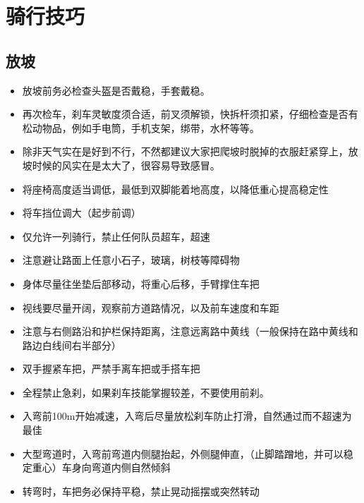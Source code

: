 \documentclass{ctexbook}
\begin{document}
\chapter{骑行技巧}
\section{放坡}
\begin{itemize}
    \item 放坡前务必检查头盔是否戴稳，手套戴稳。

    \item 再次检车，刹车灵敏度须合适，前叉须解锁，快拆杆须扣紧，仔细检查是否有松动物品，例如手电筒，手机支架，绑带，水杯等等。

    \item 除非天气实在是好到不行，不然都建议大家把爬坡时脱掉的衣服赶紧穿上，放坡时候的风实在是太大了，很容易导致感冒。
    
    \item 将座椅高度适当调低，最低到双脚能着地高度，以降低重心提高稳定性

    \item 将车挡位调大（起步前调）
    
    \item 仅允许一列骑行，禁止任何队员超车，超速

    \item 注意避让路面上任意小石子，玻璃，树枝等障碍物

    \item 身体尽量往坐垫后部移动，将重心后移，手臂撑住车把

    \item 视线要尽量开阔，观察前方道路情况，以及前车速度和车距

    \item 注意与右侧路沿和护栏保持距离，注意远离路中黄线（一般保持在路中黄线和路边白线间右半部分）

    \item 双手握紧车把，严禁手离车把或手搭车把

    \item 全程禁止急刹，如果刹车技能掌握较差，不要使用前刹。

    \item 入弯前100m开始减速，入弯后尽量放松刹车防止打滑，自然通过而不超速为最佳

    \item 大型弯道时，入弯前弯道内侧腿抬起，外侧腿伸直，（止脚踏蹭地，并可以稳定重心）车身向弯道内侧自然倾斜

    \item 转弯时，车把务必保持平稳，禁止晃动摇摆或突然转动


\end{itemize}
\end{document}
